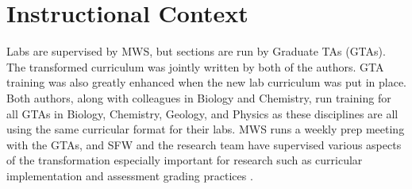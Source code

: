 \documentclass[aip, numerical, preprint]{revtex4-2}
\begin{document}
\section{Instructional Context}


Labs are supervised by MWS, but sections are run by Graduate TAs (GTAs). The transformed
curriculum was jointly written by both of the authors.  GTA training was also greatly enhanced
when the new lab curriculum was put in place.  Both authors, along with colleagues in Biology
and Chemistry, run training for all GTAs in Biology, Chemistry, Geology, and Physics as these
disciplines are all using the same curricular format for their labs.  MWS runs a weekly prep
meeting with the GTAs, and SFW and the research team have supervised various aspects of the
transformation especially important for research such as curricular implementation
\citep{SmithJoyner2020} and assessment grading practices \citep{Wolf2019}.
\end{document}
